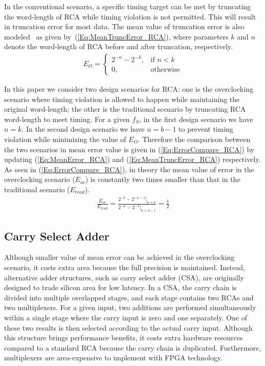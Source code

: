 \documentclass[10pt, conference, compsocconf]{IEEEtran}
\begin{document}
In the conventional scenario, a specific timing target can be met by truncating the word-length of RCA while timing violation is not permitted. This will result in truncation error for most data.  The mean value of truncation error is also modeled~\cite{SKfccm13} as given by~(\ref{Eq:MeanTruncError_RCA}), where parameters $k$ and $n$ denote the word-length of RCA before and after truncation, respectively. 
%
\begin{eqnarray}\label{Eq:MeanTruncError_RCA}
    E_O=\left\{
        \begin{matrix}
            2^{-n}-2^{-k}, & \textrm{if $n<k$}\\
            0, & \textrm{otherwise}
        \end{matrix}
        \right.
\end{eqnarray}
\vspace{-2ex}

In this paper we consider two design scenarios for RCA: one is the overclocking scenario where timing violation is allowed to happen while maintaining the original word-length; the other is the traditional scenario by truncating RCA word-length to meet timing. For a given $f_S$, in the first design scenario we have $n=k$. In the second design scenario we have $n=b-1$ to prevent timing violation while minimizing the value of $E_O$. Therefore the comparison between the two scenarios in mean error value is given in (\ref{Eq:ErrorCompare_RCA}) by updating (\ref{Eq:MeanError_RCA}) and (\ref{Eq:MeanTruncError_RCA}) respectively. As seen in (\ref{Eq:ErrorCompare_RCA}), in theory the mean value of error in the overclocking scenario ($E_{oc}$) is constantly two times smaller than that in the traditional scenario ($E_{trad}$).
%
\begin{eqnarray}\label{Eq:ErrorCompare_RCA}
    \frac{E_{oc}}{E_{trad}} = \frac{2^{-b}-2^{-n-1}|_{n=k}}{2^{-n}-2^{-k}|_{n=b-1}}=\frac{1}{2}
\end{eqnarray}

\subsection{Carry Select Adder}
Although smaller value of mean error can be achieved in the overclocking scenario, it costs extra area because the full precision is maintained. Instead, alternative adder structures, such as carry select adder (CSA), are originally designed to trade silicon area for low latency. In a CSA, the carry chain is divided into multiple overlapped stages, and each stage contains two RCAs and two multiplexers. For a given input, two additions are performed simultaneously within a single stage where the carry input is zero and one separately. One of these two results is then selected according to the actual carry input. Although this structure brings performance benefits, it costs extra hardware resources compared to a standard RCA because the carry chain is duplicated. Furthermore, multiplexers are area-expensive to implement with FPGA technology.
\end{document}
